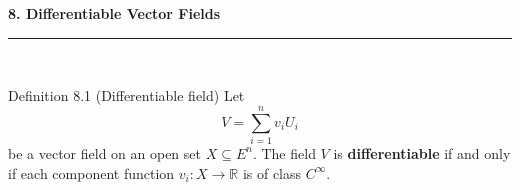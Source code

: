 \documentclass[11pt,letterpaper]{article}
\newcommand{\manualsection}[1]{%
  \Needspace{12\baselineskip}%
  \vspace{0.35cm}
  {\Large\bfseries\color{blackmain} #1}\\[2pt]
  {\color{orangeacc}\rule{\linewidth}{1.4pt}}\\[0.25cm]
}
\newcommand{\term}[1]{\textbf{\color{orangeacc}#1}}
\begin{document}
\manualsection{8. Differentiable Vector Fields}

\begin{infobox}[orangeacc]{Definition 8.1 (Differentiable field)}
Let
\begin{equation}
  V=\sum_{i=1}^{n}v_iU_i
\end{equation}
be a vector field on an open set $X\subseteq E^n$. The field $V$ is
\term{differentiable} if and only if each component function
$v_i:X\to\mathbb R$ is of class $C^\infty$.
\end{infobox}
\end{document}
